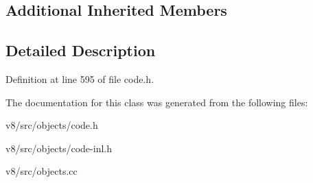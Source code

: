 \subsection*{Additional Inherited Members}


\subsection{Detailed Description}


Definition at line 595 of file code.\+h.



The documentation for this class was generated from the following files\+:\begin{DoxyCompactItemize}
\item 
v8/src/objects/code.\+h\item 
v8/src/objects/code-\/inl.\+h\item 
v8/src/objects.\+cc\end{DoxyCompactItemize}
